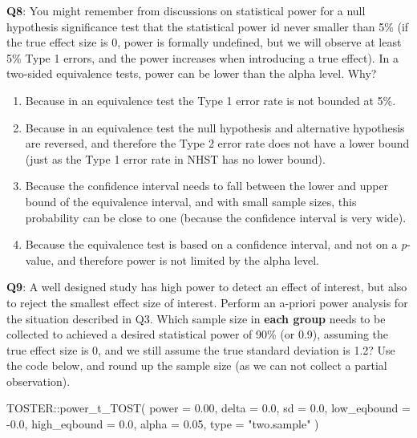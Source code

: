 \documentclass[
  oneside]{book}
\newenvironment{Shaded}{\begin{snugshade}}{\end{snugshade}}
\newcommand{\AttributeTok}[1]{\textcolor[rgb]{0.77,0.63,0.00}{#1}}
\newcommand{\FloatTok}[1]{\textcolor[rgb]{0.00,0.00,0.81}{#1}}
\newcommand{\FunctionTok}[1]{\textcolor[rgb]{0.00,0.00,0.00}{#1}}
\newcommand{\NormalTok}[1]{#1}
\newcommand{\SpecialCharTok}[1]{\textcolor[rgb]{0.00,0.00,0.00}{#1}}
\newcommand{\StringTok}[1]{\textcolor[rgb]{0.31,0.60,0.02}{#1}}
\providecommand{\tightlist}{%
  \setlength{\itemsep}{0pt}\setlength{\parskip}{0pt}}
\begin{document}
\textbf{Q8}: You might remember from discussions on statistical power for a null hypothesis significance test that the statistical power id never smaller than 5\% (if the true effect size is 0, power is formally undefined, but we will observe at least 5\% Type 1 errors, and the power increases when introducing a true effect). In a two-sided equivalence tests, power can be lower than the alpha level. Why?

\begin{enumerate}
\def\labelenumi{\Alph{enumi})}
\tightlist
\item
  Because in an equivalence test the Type 1 error rate is not bounded at 5\%.
\item
  Because in an equivalence test the null hypothesis and alternative hypothesis are reversed, and therefore the Type 2 error rate does not have a lower bound (just as the Type 1 error rate in NHST has no lower bound).
\item
  Because the confidence interval needs to fall between the lower and upper bound of the equivalence interval, and with small sample sizes, this probability can be close to one (because the confidence interval is very wide).
\item
  Because the equivalence test is based on a confidence interval, and not on a \emph{p}-value, and therefore power is not limited by the alpha level.
\end{enumerate}

\textbf{Q9}: A well designed study has high power to detect an effect of interest, but also to reject the smallest effect size of interest. Perform an a-priori power analysis for the situation described in Q3. Which sample size in \textbf{each group} needs to be collected to achieved a desired statistical power of 90\% (or 0.9), assuming the true effect size is 0, and we still assume the true standard deviation is 1.2? Use the code below, and round up the sample size (as we can not collect a partial observation).

\begin{Shaded}
\begin{Highlighting}[]
\NormalTok{TOSTER}\SpecialCharTok{::}\FunctionTok{power\_t\_TOST}\NormalTok{(}
  \AttributeTok{power =} \FloatTok{0.00}\NormalTok{,}
  \AttributeTok{delta =} \FloatTok{0.0}\NormalTok{,}
  \AttributeTok{sd =} \FloatTok{0.0}\NormalTok{,}
  \AttributeTok{low\_eqbound =} \SpecialCharTok{{-}}\FloatTok{0.0}\NormalTok{,}
  \AttributeTok{high\_eqbound =} \FloatTok{0.0}\NormalTok{,}
  \AttributeTok{alpha =} \FloatTok{0.05}\NormalTok{,}
  \AttributeTok{type =} \StringTok{"two.sample"}
\NormalTok{)}
\end{Highlighting}
\end{Shaded}
\end{document}
